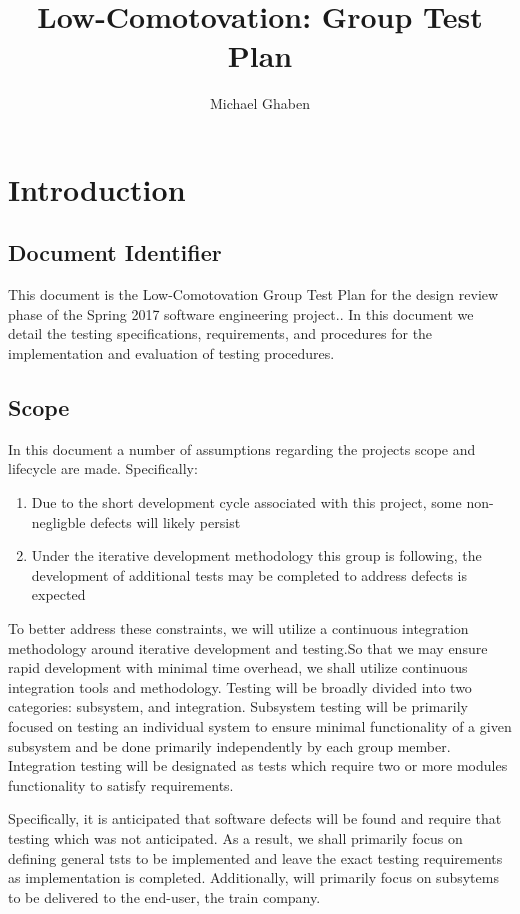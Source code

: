 \documentclass[]{article}
\title{Low-Comotovation: Group Test Plan}
\author{Michael Ghaben}
\date{}
\begin{document}
\maketitle
\tableofcontents
\titlepage
\section{Introduction}
\subsection{Document Identifier}
This document is the Low-Comotovation Group Test Plan for the design review phase of the Spring 2017 software engineering project.. In this document we detail the testing specifications, requirements, and procedures for the implementation and evaluation of testing procedures.

\subsection{Scope}
In this document a number of assumptions regarding the projects scope and lifecycle are made. Specifically:

\begin{enumerate}
	\item Due to the short development cycle associated with this project, some non-negligble defects will likely persist
	\item Under the iterative development methodology this group is following, the development of additional tests may be completed to address defects is expected
\end{enumerate}
To better address these constraints, we will utilize a continuous integration methodology around iterative development and testing.So that we may ensure rapid development with minimal time overhead, we shall utilize continuous integration tools and methodology. Testing will be broadly divided into two categories: subsystem, and integration. Subsystem testing will be primarily focused on testing an individual system to ensure minimal functionality of a given subsystem and be done primarily independently by each group member. Integration testing will be designated as tests which require two or more modules functionality to satisfy requirements.

Specifically, it is anticipated that software defects will be found and require that testing which was not anticipated. As a result, we shall primarily focus on defining general tsts to be implemented and leave the exact testing requirements as implementation is completed. Additionally, will primarily focus on subsytems to be delivered to the end-user, the train company.
\end{document}
